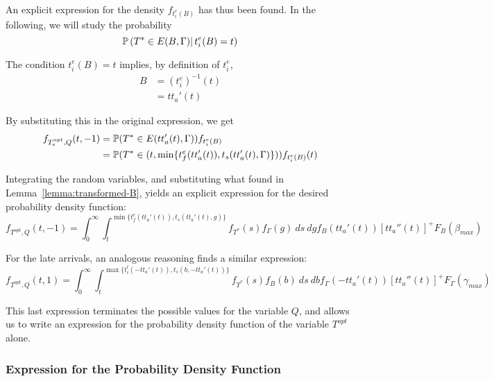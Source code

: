 An explicit expression for the density \(f_{t_i^e(B)}\) has thus been found.
In the following, we will study the probability
\begin{equation*}
  \mathbb{P}\left(T^* \in E(B, \Gamma)|\, t_i^e(B) = t\right)
\end{equation*}

The condition \(t_i^e(B) = t\) implies, by definition of \(t_i^e\),
\begin{align*}
  B & = (t_i^e)^{-1}(t) \\
    & = tt_a'(t)
\end{align*}

By substituting this in the original expression, we get
\begin{equation}
  \label{eq:early-subst}
  \begin{split}
    f_{T_e^{opt}, Q}(t, -1) & = \mathbb{P}(T^* \in E(tt_a'(t), \Gamma))f_{t_i^e(B)}\\
    & = \mathbb{P}(T^* \in (t, \min\{t_f^e(tt_a'(t)), t_s(tt_a'(t), \Gamma)\}))f_{t_i^e(B)}(t)
  \end{split}
\end{equation}

Integrating the random variables,
and substituting what found in Lemma~\ref{lemma:transformed-B},
yields an explicit expression for the desired probability density function:
\begin{equation}
  \label{eq:early-final}
  f_{T^{opt}, Q}(t, -1) = \int_0^\infty \int_t^{\min\{t_f^e(tt_a'(t)), t_s(tt_a'(t), g)\}}f_{T^*}(s) f_\Gamma(g)\ ds\ dg f_B(tt_a'(t)) [tt_a''(t)]^+ F_B(\beta_{max})
\end{equation}

For the late arrivals, an analogous reasoning finds a similar expression:
\begin{equation}
  \label{eq:late-final}
  f_{T^{opt}, Q}(t, 1) = \int_0^\infty \int_t^{\max\{t_i^l(-tt_a'(t)), t_s(b, -tt_a'(t))\}}f_{T^*}(s) f_B(b)\ ds\ db f_\Gamma(-tt_a'(t)) [tt_a''(t)]^+ F_\Gamma(\gamma_{max})
\end{equation}

This last expression terminates the possible values for the variable \(Q\),
and allows us to write an expression for the probability density function of the variable \(T^{opt}\) alone.

\subsubsection{Expression for the Probability Density Function}

